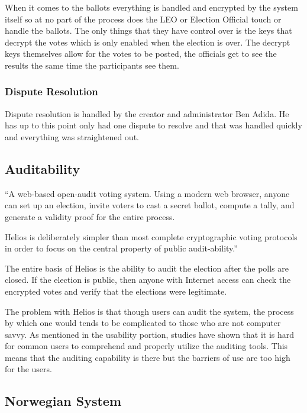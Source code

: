When it comes to the ballots everything is handled and encrypted by
the system itself so at no part of the process does the LEO or
Election Official touch or handle the ballots. The only things that
they have control over is the keys that decrypt the votes which is
only enabled when the election is over. The decrypt keys themselves
allow for the votes to be posted, the officials get to see the results
the same time the participants see them.

\subsubsection{Dispute Resolution}

Dispute resolution is handled by the creator and administrator Ben
Adida. He has up to this point only had one dispute to resolve and
that was handled quickly and everything was straightened out.

\subsection{Auditability}

``A web-based open-audit voting system. Using a modern web browser,
anyone can set up an election, invite voters to cast a secret ballot,
compute a tally, and generate a validity proof for the entire process.

Helios is deliberately simpler than most complete cryptographic voting
protocols in order to focus on the central property of public
audit-ability.''~\cite{adida2008}

The entire basis of Helios is the ability to audit the election after
the polls are closed. If the election is public, then anyone with
Internet access can check the encrypted votes and verify that the
elections were legitimate.

The problem with Helios is that though users can audit the system, the
process by which one would tends to be complicated to those who are
not computer savvy. As mentioned in the usability portion, studies
have shown that it is hard for common users to comprehend and properly
utilize the auditing tools. This means that the auditing capability is
there but the barriers of use are too high for the users.

\subsection{Norwegian System~\cite{gjosteen2012}}

